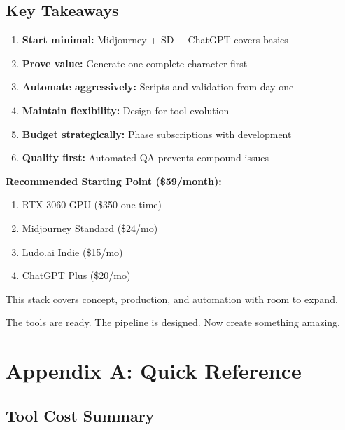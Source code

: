 \documentclass[11pt]{article}
\begin{document}
\subsection{Key Takeaways}

\begin{enumerate}
    \item \textbf{Start minimal:} Midjourney + SD + ChatGPT covers basics
    \item \textbf{Prove value:} Generate one complete character first
    \item \textbf{Automate aggressively:} Scripts and validation from day one
    \item \textbf{Maintain flexibility:} Design for tool evolution
    \item \textbf{Budget strategically:} Phase subscriptions with development
    \item \textbf{Quality first:} Automated QA prevents compound issues
\end{enumerate}

\begin{tipbox}
\textbf{Recommended Starting Point (\$59/month):}
\begin{enumerate}
    \item RTX 3060 GPU (\$350 one-time)
    \item Midjourney Standard (\$24/mo)
    \item Ludo.ai Indie (\$15/mo)
    \item ChatGPT Plus (\$20/mo)
\end{enumerate}

This stack covers concept, production, and automation with room to expand.
\end{tipbox}

\vspace{2em}

The tools are ready. The pipeline is designed. Now create something amazing.

\appendix

\section{Appendix A: Quick Reference}

\subsection{Tool Cost Summary}
\end{document}
